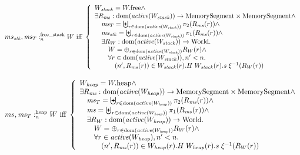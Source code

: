 \documentclass[a4paper]{article}
\begin{document}
{\[
  \memSatFStack{ms_\stk,\ms_T}{W} \text{ iff } 
  \left\{
    \begin{array}{l}
      W_\var{stack} = \pwfree \wedge \\
      \exists R_\ms : \dom(\activeReg{W_\var{stack}}) \fun \MemSeg \times \MemSeg \wedge \\
      \quad \ms_T = \biguplus_{r \in \dom(\activeReg{W_\var{stack}})} \pi_2(R_\ms(r)) \wedge \\
      \quad \ms_\stk = \biguplus_{r \in \dom(\activeReg{W_\var{stack}})} \pi_1(R_\ms(r)) \wedge \\
      \quad \exists R_W : \dom(\activeReg{W_\var{stack}}) \fun \World\ldotp\\
      \qquad W = \oplus_{r \in \dom(\activeReg{W_\var{stack}})} R_W(r) \wedge\\
      \qquad \forall r \in \dom(\activeReg{W_\var{stack}}), n' < n \ldotp \\
      \qquad \quad \npair[n']{R_\ms(r)} \in  W_\var{stack}(r).H \; W_\var{stack}(r).s \; \xi^{-1}(R_W(r))
    \end{array}
  \right.
\]

\[
  \memSatHeap{ms,\ms_T}{W} \text{ iff } 
  \left\{
    \begin{array}{l}
      W_\var{heap} = \pwheap \wedge \\
      \exists R_\ms : \dom(\activeReg{W_\var{heap}}) \fun \MemSeg \times \MemSeg \wedge \\
      \quad \ms_T = \biguplus_{r \in \dom(\activeReg{W_\var{heap}})} \pi_2(R_\ms(r)) \wedge \\
      \quad \ms = \biguplus_{r \in \dom(\activeReg{W_\var{heap}})} \pi_1(R_\ms(r)) \wedge \\
      \quad \exists R_W : \dom(\activeReg{W_\var{heap}}) \fun \World\ldotp\\
      \qquad W = \oplus_{r \in \dom(\activeReg{W_\var{heap}})} R_W(r) \wedge\\
      \qquad \forall r \in \activeReg{W_\var{heap}}, n' < n \ldotp \\
      \qquad \quad \npair[n']{R_\ms(r)} \in  W_\var{heap}(r).H \; W_\var{heap}(r).s \; \xi^{-1}(R_W(r))
    \end{array}
  \right.
\]
}
\end{document}
